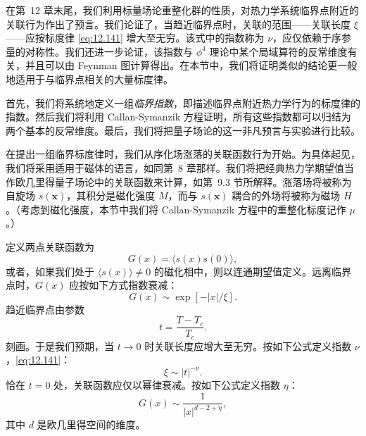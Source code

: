 在第~12 章末尾，我们利用标量场论重整化群的性质，对热力学系统临界点附近的关联行为作出了预言。我们论证了，当趋近临界点时，关联的范围——关联长度 $\xi$——应按标度律 \eqref{eq:12.141} 增大至无穷。该式中的指数称为 $\nu$，应仅依赖于序参量的对称性。我们还进一步论证，该指数与 $\phi^4$ 理论中某个局域算符的反常维度有关，并且可以由 Feynman 图计算得出。在本节中，我们将证明类似的结论更一般地适用于与临界点相关的大量标度律。

首先，我们将系统地定义一组\emph{临界指数}，即描述临界点附近热力学行为的标度律的指数。然后我们将利用 Callan-Symanzik 方程证明，所有这些指数都可以归结为两个基本的反常维度。最后，我们将把量子场论的这一非凡预言与实验进行比较。

在提出一组临界标度律时，我们从序化场涨落的关联函数行为开始。为具体起见，我们将采用适用于磁体的语言，如同第~8 章那样。我们将把经典热力学期望值当作欧几里得量子场论中的关联函数来计算，如第~9.3 节所解释。涨落场将被称为自旋场 $s(\mathbf{x})$，其积分是磁化强度 $M$，而与 $s(\mathbf{x})$ 耦合的外场将被称为磁场 $H$。（考虑到磁化强度，本节中我们将 Callan-Symanzik 方程中的重整化标度记作 $\mu$。）

定义两点关联函数为
\begin{equation}
  G(x) = \langle s(x)s(0)\rangle ,
  \label{eq:13.1}
\end{equation}
或者，如果我们处于 $\langle s(x)\rangle \neq 0$ 的磁化相中，则以连通期望值定义。远离临界点时，$G(x)$ 应按如下方式指数衰减：
\begin{equation}
  G(x) \sim \exp[-|x|/\xi] .
  \label{eq:13.2}
\end{equation}
趋近临界点由参数
\begin{equation}
  t = \frac{T - T_c}{T_c} .
  \label{eq:13.3}
\end{equation}
刻画。于是我们预期，当 $t\to 0$ 时关联长度应增大至无穷。按如下公式定义指数 $\nu$，\eqref{eq:12.141}：
\begin{equation}
  \xi \sim |t|^{-\nu} .
  \label{eq:13.4}
\end{equation}
恰在 $t=0$ 处，关联函数应仅以幂律衰减。按如下公式定义指数 $\eta$：
\begin{equation}
  G(x) \sim \frac{1}{|x|^{d-2+\eta}} ,
  \label{eq:13.5}
\end{equation}
其中 $d$ 是欧几里得空间的维度。

